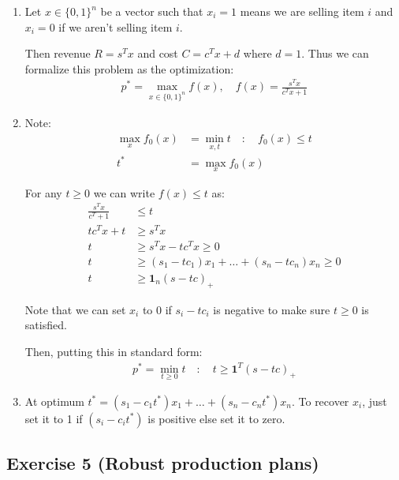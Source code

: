 \documentclass[11pt]{article}
\begin{document}
\begin{solution}
\begin{enumerate}
    \item Let $x \in \{0,1\}^n$ be a vector such that $x_i = 1$ means we are selling item $i$ and $x_i = 0$ if we aren't selling item $i$.

    Then revenue $R = s^T x$ and cost $C = c^T x + d$ where $d = 1$. Thus we can formalize this problem as the optimization:
    \begin{align*}
        p^* = \max_{x \in \{0,1\}^n} f(x), \quad f(x) = \frac{s^T x}{c^T x + 1}
    \end{align*}

    \item Note:
    \begin{align*}
        \max_x f_0(x) &= \min_{x,t} t \quad : \quad f_0(x) \leq t \\
        t^* &= \max_x f_0(x)
    \end{align*}

    For any $t \geq 0$ we can write $f(x) \leq t$ as:
    \begin{align*}
        \frac{s^T x}{c^T + 1} &\leq t \\
        t c^T x + t &\geq s^T x \\
        t &\geq s^Tx - t c^T x \geq 0 \\
        t &\geq (s_1 - t c_1)x_1 + \dots + (s_n - t c_n)x_n \geq 0 \\
        t &\geq \mathbf{1}_n (s-tc)_{+}
    \end{align*}

    Note that we can set $x_i$ to 0 if $s_i - t c_i$ is negative to make sure $t \geq 0$ is satisfied.

    Then, putting this in standard form:
    \begin{align*}
        p^* = \min_{t \geq 0} t \quad : \quad t \geq \mathbf{1}^T (s - tc)_{+}
    \end{align*}

    \item At optimum $t^* = (s_1 - c_1 t^*)x_1 + \dots + (s_n - c_n t^*)x_n$. To recover $x_i$, just set it to 1 if $(s_i - c_i t^*)$ is positive else set it to zero.
\end{enumerate}
\end{solution}

\newpage
\subsection*{Exercise 5 (Robust production plans)}
\end{document}
